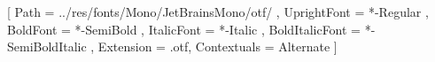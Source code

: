 \setmonofont{JetBrainsMono}
[
	Path = ../res/fonts/Mono/JetBrainsMono/otf/ ,
	UprightFont = *-Regular ,
	BoldFont = *-SemiBold ,
	ItalicFont = *-Italic ,
	BoldItalicFont = *-SemiBoldItalic ,
	Extension = .otf,
	Contextuals = Alternate
]
